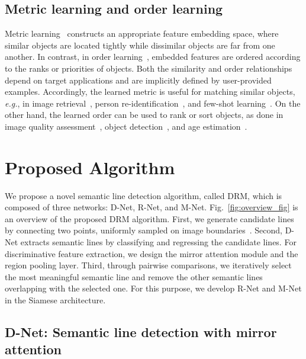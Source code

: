 \documentclass[runningheads]{llncs}
\newcommand{\eg}{\textit{e.g.}}
\begin{document}
\subsection{Metric learning and order learning}
Metric learning~\cite{sohn2016,oh2016} constructs an appropriate feature embedding space, where similar objects are located tightly  while dissimilar objects are far from one another. In contrast, in order learning~\cite{lim2020}, embedded features are ordered according to the ranks or priorities of  objects. Both the similarity and order relationships depend on target applications and are implicitly defined by user-provided examples. Accordingly, the learned metric is useful for matching similar objects, \eg, in image retrieval~\cite{hoi2010,gao2014soml}, person re-identification~\cite{ding2015,chu2019}, and few-shot learning~\cite{vinyals2016_nips,sung2018_CVPR}. On the other hand, the learned order can be used to rank or sort objects, as done in image quality assessment~\cite{kong2016,Liu2017_ICCV}, object detection~\cite{tan2019,singh2019}, and age estimation~\cite{Chen2017_CVPR,chen2017_tmm}.

\section{Proposed Algorithm}
We propose a novel semantic line detection algorithm, called DRM, which is composed of three networks: D-Net, R-Net, and M-Net. Fig.~\ref{fig:overview_fig} is an overview of the proposed DRM algorithm. First, we generate candidate lines by connecting two points, uniformly sampled on image boundaries~\cite{lee2017}. Second, D-Net extracts semantic lines by classifying and regressing the candidate lines. For discriminative feature extraction, we design the mirror attention module and the region pooling layer. Third, through pairwise comparisons, we iteratively select the most meaningful semantic line and remove the other semantic lines overlapping with the selected one. For this purpose, we develop R-Net and M-Net in the Siamese architecture.

\subsection{D-Net: Semantic line detection with mirror attention}
\end{document}
